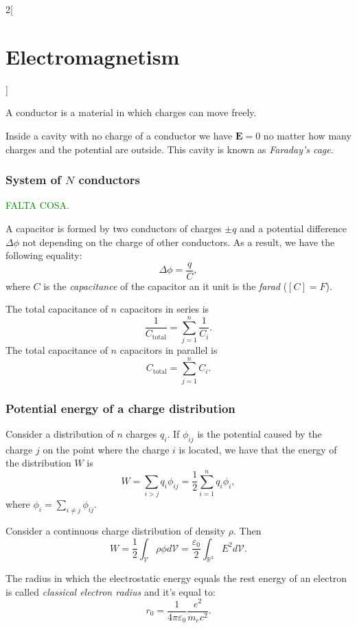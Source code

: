 \documentclass[../../../main.tex]{subfiles}
\begin{document}
\begin{multicols}{2}[\section{Electromagnetism}]
\begin{concept}
\end{concept}
\begin{definition}
A conductor is a material in which charges can move freely.
\end{definition}
\begin{concept}
Inside a cavity with no charge of a conductor we have $\boldsymbol{E}=0$ no matter how many charges and the potential are outside. This cavity is known as \textit{Faraday's cage}.
\end{concept}
\subsubsection*{System of $N$ conductors}
\textcolor{green}{FALTA COSA.}
\begin{definition}[Capacitor]
A capacitor is formed by two conductors of charges $\pm q$ and a potential difference $\Delta\phi$ not depending on the charge of other conductors. As a result, we have the following equality: $$\Delta\phi=\frac{q}{C},$$ where $C$ is the \textit{capacitance} of the capacitor an it unit is the \textit{farad} ($[C]=F$).
\end{definition}
\begin{concept}
The total capacitance of $n$ capacitors in series is $$\frac{1}{C_\text{total}}=\sum_{j=1}^n\frac{1}{C_i}.$$
The total capacitance of $n$ capacitors in parallel is $$C_\text{total}=\sum_{j=1}^nC_i.$$
\end{concept}
\subsubsection*{Potential energy of a charge distribution}
\begin{concept}
Consider a distribution of $n$ charges $q_i$. If $\phi_{ij}$ is the potential caused by the charge $j$ on the point where the charge $i$ is located, we have that the energy of the distribution $W$ is $$W=\sum_{i>j}q_i\phi_{ij}=\frac{1}{2}\sum_{i=1}^nq_i\phi_i,$$ where $\displaystyle\phi_i=\sum_{i\ne j}\phi_{ij}$.
\end{concept}
\begin{concept}
Consider a continuous charge distribution of density $\rho$. Then $$W=\frac{1}{2}\int_\mathcal{V}\rho\phi d\mathcal{V}=\frac{\varepsilon_0}{2}\int_{\mathbb{R}^3}E^2d\mathcal{V}.$$
\end{concept}
\begin{definition}
The radius in which the electrostatic energy equals the rest energy of an electron is called \textit{classical electron radius} and it's equal to: $$r_0=\frac{1}{4\pi\varepsilon_0}\frac{e^2}{m_ec^2}.$$
\end{definition}
\end{multicols}
\end{document}
